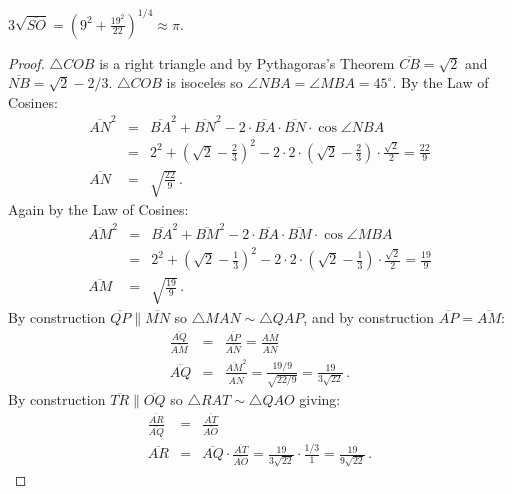\newpage

\begin{theorem}\label{thm.ramanujan2}
$3\sqrt{\overline{SO}}=\left(9^2+\displaystyle\frac{19^2}{22}\right)^{1/4}\approx \pi$.
\end{theorem}
\begin{proof}
$\triangle COB$ is a right triangle and by Pythagoras's Theorem $\overline{CB}=\sqrt{2}$ and $\overline{NB}=\sqrt{2}-2/3$. $\triangle COB$ is isoceles so $\angle NBA =\angle MBA=45^\circ$. By the Law of Cosines:
\begin{eqnarray*}
\overline{AN}^2&=&\overline{BA}^2 + \overline{BN}^2-2\cdot\overline{BA}\cdot\overline{BN}\cdot\cos \angle NBA\\
&=&2^2+\left(\sqrt{2}-\frac{2}{3}\right)^2-2\cdot 2 \cdot \left(\sqrt{2}-\frac{2}{3}\right)\cdot \frac{\sqrt{2}}{2}
=\frac{22}{9}\\
\overline{AN}&=&\sqrt{\frac{22}{9}}\,.
\end{eqnarray*}
Again by the Law of Cosines:
\begin{eqnarray*}
\overline{AM}^2&=&\overline{BA}^2 + \overline{BM}^2-2\cdot\overline{BA}\cdot\overline{BM}\cdot\cos \angle MBA\\
&=&2^2+\left(\sqrt{2}-\frac{1}{3}\right)^2-2\cdot 2 \cdot \left(\sqrt{2}-\frac{1}{3}\right)\cdot \frac{\sqrt{2}}{2}
=\frac{19}{9}\\
\overline{AM}&=&\sqrt{\frac{19}{9}}\,.
\end{eqnarray*}
By construction $\overline{QP}\| \overline{MN}$ so
$\triangle MAN\sim \triangle QAP$, and by construction $\overline{AP}=\overline{AM}$:
\begin{eqnarray*}
\frac{\overline{AQ}}{\overline{AM}}&=&\frac{\overline{AP}}{\overline{AN}}=\frac{\overline{AM}}{\overline{AN}}\\
\overline{AQ}&=&\frac{\overline{AM}^2}{\overline{AN}}=\frac{19/9}{\sqrt{22/9}}=\frac{19}{3\sqrt{22}}\,.
\end{eqnarray*}
By construction $\overline{TR}\| \overline{OQ}$ so
$\triangle RAT\sim \triangle QAO$ giving:
\begin{eqnarray*}
\frac{\overline{AR}}{\overline{AQ}}&=&\frac{\overline{AT}}{\overline{AO}}\\
\overline{AR}&=&\overline{AQ}\cdot\frac{\overline{AT}}{\overline{AO}}=\frac{19}{3\sqrt{22}}\cdot\frac{1/3}{1}=\frac{19}{9\sqrt{22}}\,.

\end{eqnarray*}
\end{proof}

